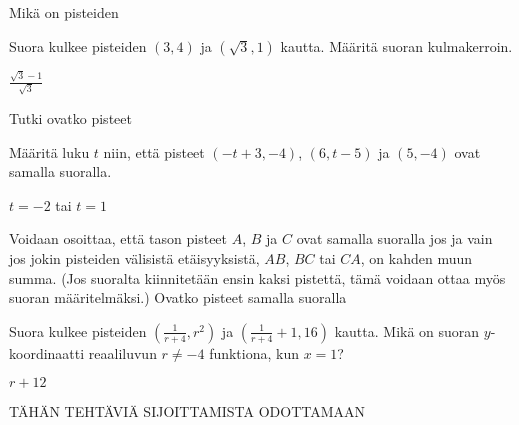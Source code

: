\begin{tehtavasivu}
\begin{tehtava}
Mikä on pisteiden
\begin{vastaus}
\end{vastaus}
\end{tehtava}

\begin {tehtava}
Suora kulkee pisteiden $(3, 4)$ ja $(\sqrt{3}, 1)$ kautta. Määritä suoran kulmakerroin.
\begin {vastaus}
$\frac{\sqrt{3}-1}{\sqrt{3}}$
\end {vastaus}
\end {tehtava}

\sarjaB %

\begin{tehtava}
Tutki ovatko pisteet  
\begin{vastaus}
\end{vastaus}
\end{tehtava}

\begin{tehtava}
Määritä luku $t$ niin, että pisteet $(-t+3, -4)$, $(6, t-5)$ ja $(5, -4)$ ovat samalla suoralla.
\begin{vastaus}
$t=-2$ tai $t=1$
\end{vastaus}
\end{tehtava}

\begin{tehtava}
Voidaan osoittaa, että tason pisteet $A$, $B$ ja $C$ ovat samalla suoralla jos ja vain jos jokin pisteiden välisistä etäisyyksistä, $AB$, $BC$ tai $CA$, on kahden muun summa. (Jos suoralta kiinnitetään ensin kaksi pistettä, tämä voidaan ottaa myös suoran määritelmäksi.) Ovatko pisteet samalla suoralla
	\begin{vastaus}
	\end{vastaus}
\end{tehtava}

\sarjaC %

\begin{tehtava}
Suora kulkee pisteiden $(\frac{1}{r+4}, r^2)$ ja $(\frac{1}{r+4}+1, 16)$ kautta. Mikä on suoran $y$-koordinaatti reaaliluvun $r \ne -4$ funktiona, kun $x=1$?
\begin{vastaus}
$r+12$
\end{vastaus}
\end{tehtava}

\sarjaD %

TÄHÄN TEHTÄVIÄ SIJOITTAMISTA ODOTTAMAAN

\end{tehtavasivu}
